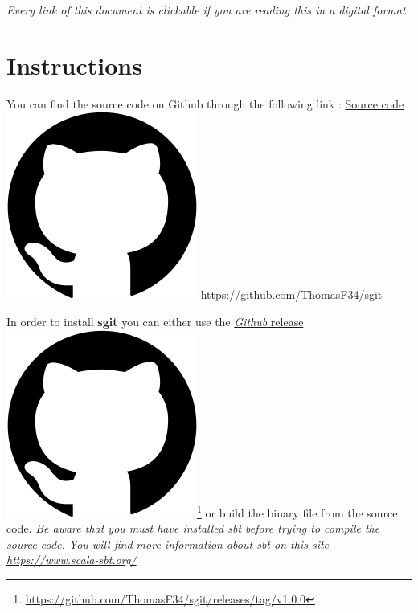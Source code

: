 \documentclass[11pt]{article}
\begin{document}


\newpage
\thispagestyle{empty}
\addtocounter{page}{-1}
\tableofcontents
\vfill
\textit{Every link of this document is clickable if you are reading this in a digital format}
\vfill
\clearpage

\section{Instructions}

You can find the source code on Github through the following link : \href{https://github.com/ThomasF34/sgit}{Source code \includegraphics[height=\fontcharht\font`\l]{img/github.png}} {\ul{https://github.com/ThomasF34/sgit}}\newline

In order to install \textbf{sgit} you can either use the \href{https://github.com/ThomasF34/sgit/releases/tag/v1.0.0}{\textit{Github} release \includegraphics[height=\fontcharht\font`\l]{img/github.png}}\footnote{\href{https://github.com/ThomasF34/sgit/releases/tag/v1.0.0}{\ul{https://github.com/ThomasF34/sgit/releases/tag/v1.0.0}}} or build the binary file from the source code. \textit{Be aware that you must have installed sbt before trying to compile the source code. You will find more information about \textit{sbt} on this site \href{https://www.scala-sbt.org/}{https://www.scala-sbt.org/}}\\
\end{document}
